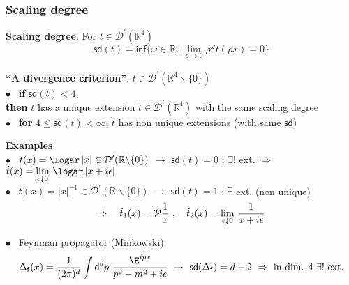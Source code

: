 \documentclass[9pt]{beamer}
\newcommand{\abs}[1]{\left|{#1}\right|} %
\renewcommand{\inf}{\mathsf{inf}} %
\newcommand{\sd}{\mathsf{sd}} %
\newcommand{\Dcal}{\mathcal{D}}
\newcommand{\Pcal}{\mathcal{P}}
\newcommand{\Rbb}{\mathbb{R}}
\newcommand{\dsf}{\mathsf{d}}
\newcommand{\fsf}{\mathsf{f}}
\begin{document}
\begin{frame}

\frametitle{Scaling degree}

\vfill

\textbf{Scaling degree}: For $t \in \Dcal^\prime(\Rbb^4)$  
\\[-15pt]
\begin{equation*}
\sd(t) = \inf \{\omega\in\Rbb \ | \ \lim_{\rho \to 0}\rho^\omega t(\rho x)=0 \} 
\end{equation*}

\vspace*{-8pt}

\begin{block}{}
\vspace*{-10pt}
\textbf{``A divergence criterion''}, $t \in \Dcal^\prime(\Rbb^4\backslash\{0\})$ \quad {} \\
$\bullet$ \ \textbf{if} $\sd(t) < 4$, \\
\hspace*{8pt} \textbf{then} $t$ has a unique extension $\dot{t} \in \Dcal^\prime(\Rbb^4)$ with the same scaling degree \\
$\bullet$ \ \textbf{for} $4 \leq \sd(t) < \infty$, $\dot{t}$ has non unique extensions (with same $\sd$)
\end{block}

\vspace*{-4pt}

\textbf{Examples} \\[2pt]

$\bullet$ \ $t(x) = \logar\abs{x} \in \Dcal^\prime(\Rbb\backslash\{0\})$ $\to$ $\sd(t) = 0$ : $\exists!$ ext. $\Rightarrow$ $\dot{t}(x) = \underset{\epsilon \downarrow 0}{\lim} \ \logar\abs{x+i\epsilon}$ \\

$\bullet$ \ $t(x) = \abs{x}^{-1} \in \Dcal^\prime(\Rbb\backslash\{0\})$ $\to$ $\sd(t) = 1$ : $\exists$ ext. (non unique) \\
\vspace*{-14pt}
\begin{equation*}
\Rightarrow \quad \dot{t}_1(x) = \Pcal\frac1x \ , \quad \dot{t}_2(x) = \underset{\epsilon \downarrow 0}{\lim} \ \frac{1}{x + i \epsilon}
\vspace*{-2pt}
\end{equation*}

$\bullet$ \ Feynman propagator (Minkowski)
\vspace*{-10pt}
\begin{equation*}
\Delta_\fsf(x) = \frac{1}{(2\pi)^d} \int \dsf^dp \ \frac{\E^{ipx}}{p^2-m^2+i\epsilon} \ \to \ \sd(\Delta_\fsf)=d-2 \ \Rightarrow \mbox{ in dim. } 4 \ \exists! \mbox{ ext.} 
\end{equation*}
 
\end{frame}
\end{document}
